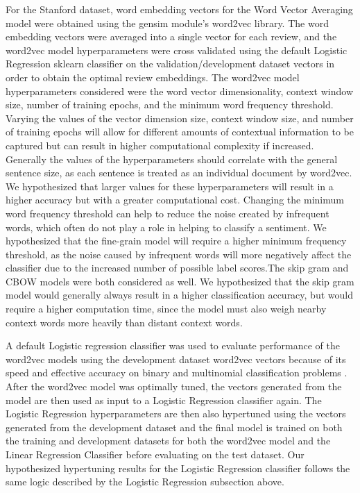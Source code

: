 \documentclass[conference]{IEEEtran}
\begin{document}
For the Stanford dataset, word embedding vectors for the Word Vector Averaging model were obtained using the gensim module's word2vec library. The word embedding vectors were averaged into a single vector for each review, and the word2vec model hyperparameters were cross validated using the default Logistic Regression sklearn classifier on the validation/development dataset vectors in order to obtain the optimal review embeddings. The word2vec model hyperparameters considered were the word vector dimensionality, context window size, number of training epochs, and the minimum word frequency threshold. Varying the values of the vector dimension size, context window size, and number of training epochs will allow for different amounts of contextual information to be captured but can result in higher computational complexity if increased. Generally the values of the hyperparameters should correlate with the general sentence size, as each sentence is treated as an individual document by word2vec. We hypothesized that larger values for these hyperparameters will result in a higher accuracy but with a greater computational cost. Changing the minimum word frequency threshold can help to reduce the noise created by infrequent words, which often do not play a role in helping to classify a sentiment. We hypothesized that the fine-grain model will require a higher minimum frequency threshold, as the noise caused by infrequent words will more negatively affect the classifier due to the increased number of possible label scores.The skip gram and CBOW models were both considered as well. We hypothesized that the skip gram model would generally always result in a higher classification accuracy, but would require a higher computation time, since the model must also weigh nearby context words more heavily than distant context words.

A default Logistic regression classifier was used to evaluate performance of the word2vec models using the development dataset word2vec vectors because of its speed and effective accuracy on binary and multinomial classification problems . After the word2vec model was optimally tuned, the vectors generated from the model are then used as input to a Logistic Regression classifier again. The Logistic Regression hyperparameters are then also hypertuned using the vectors generated from the development dataset and the final model is trained on both the training and development datasets for both the word2vec model and the Linear Regression Classifier before evaluating on the test dataset. Our hypothesized hypertuning results for the Logistic Regression classifier follows the same logic described by the Logistic Regression subsection above.
\end{document}
